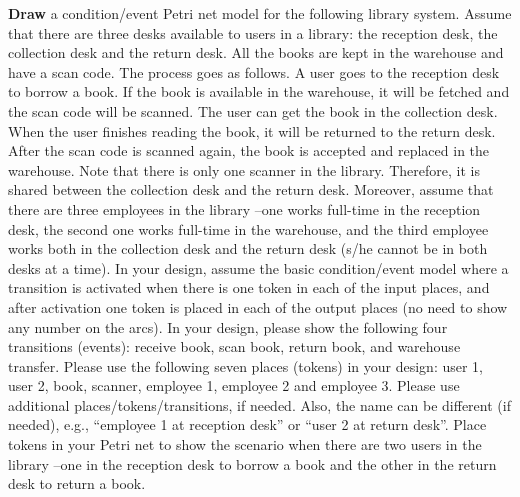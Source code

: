 \documentclass[11pt,letterpaper]{article}
\begin{document}
{\bf Draw} a  condition/event Petri  net  model  for  the  following  library  system. Assume  that there  are three  desks  available  to  users  in  a  library: the  reception  desk,  the  collection  desk  and  the  return  desk.  All the  books  are kept in the warehouse and have a scan code.  The process goes as follows. A user goes to the reception desk to borrow a book. If the book is available in the warehouse, it will be fetched and the scan code will be scanned. The user can get the book in the collection desk. When the user finishes reading the book, it will be returned to the return desk. After the scan code  is  scanned  again,  the  book  is  accepted  and  replaced  in  the  warehouse. Note  that  there  is  only  one  scanner  in  the library. Therefore,  it  is  shared  between  the  collection  desk  and  the  return  desk.  Moreover,  assume  that  there  are  three employees in the library –one works full-time in the reception desk, the second one works full-time in the warehouse, and the third employee works both in the collection desk and the return desk (s/he cannot be in both desks at a time). In your design, assume the basic condition/event model where a transition is activated when there is one token in each of the input places, and after activation one token is placed in each of the output places (no need to show any number on the arcs). In your  design,  please  show  the  following  four  transitions  (events):  receive  book,  scan  book,  return  book,  and  warehouse transfer.  Please  use  the  following seven places  (tokens)  in  your  design:  user  1,  user  2, book, scanner,  employee  1, employee 2 and employee 3. Please use additional places/tokens/transitions, if needed. Also, the name can be different (if needed), e.g., “employee 1 at reception desk” or “user 2 at return desk”. Place tokens  in  your  Petri  net  to  show  the scenario when there are two users in the library –one in the reception desk to borrow a book and the other in the return desk to return a book.
\end{document}
